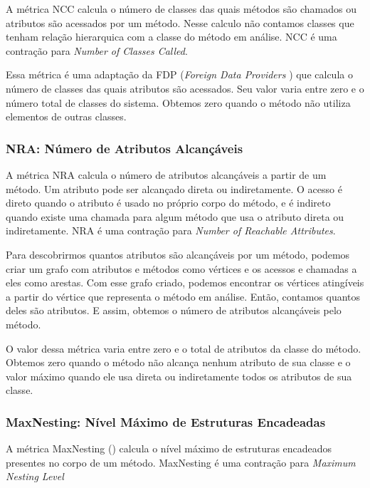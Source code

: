    	A métrica NCC calcula o número de classes das quais métodos são chamados ou atributos são acessados por um método. Nesse calculo não contamos classes que tenham relação hierarquica  com a classe do método em análise. NCC é uma contração para \textit{Number of Classes Called}.

	Essa métrica é uma adaptação da FDP (\textit{Foreign Data Providers} \citep{Lanza06}) que calcula o número de classes das quais atributos são acessados. Seu valor varia entre zero e o número total de classes do sistema. Obtemos zero quando o método não utiliza elementos de outras classes.

	
	
\subsubsection{NRA: Número de Atributos Alcançáveis}
                                           
	A métrica NRA calcula o número de atributos alcançáveis a partir de um método. Um atributo pode ser alcançado direta ou indiretamente. O acesso é direto quando o atributo é usado no próprio corpo do método, e é indireto quando existe uma chamada para algum método que usa o atributo direta ou indiretamente. NRA é uma contração para \textit{Number of Reachable Attributes}.
	          
	Para descobrirmos quantos atributos são alcançáveis por um método, podemos criar um grafo com atributos e métodos como vértices e os acessos e chamadas a eles como arestas. Com esse grafo criado, podemos encontrar os vértices atingíveis a partir do vértice que representa o método em análise. Então, contamos quantos deles são atributos. E assim, obtemos o número de atributos alcançáveis pelo método.
                                                           
	O valor dessa métrica varia entre zero e o total de atributos da classe do método. Obtemos zero quando o método não alcança nenhum atributo de sua classe e o valor máximo quando ele usa direta ou indiretamente todos os atributos de sua classe.
                          


\subsubsection{MaxNesting: Nível Máximo de Estruturas Encadeadas}
                         
	A métrica MaxNesting (\citep{Lanza06}) calcula o nível máximo de estruturas encadeados presentes no corpo de um método. MaxNesting é uma contração para \textit{Maximum Nesting Level}
	
